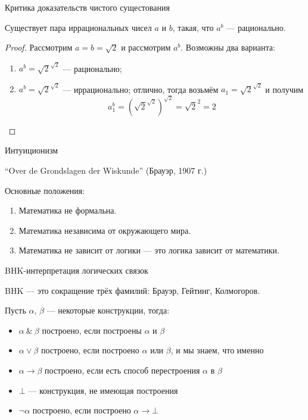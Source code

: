 \documentclass[aspectratio=169]{beamer}
\begin{document}
\begin{frame}{Критика доказательств чистого сущестования}
\begin{thmrus}Существует пара иррациональных чисел $a$ и $b$,
такая, что $a^b$ — рационально.
\end{thmrus}

\begin{proof}
Рассмотрим $a = b = \sqrt{2}$ и рассмотрим $a^b$.
Возможны два варианта:

\begin{enumerate}
\item $a^b = \sqrt{2}^{\sqrt{2}}$ — рационально;
\item $a^b = \sqrt{2}^{\sqrt{2}}$ — иррационально; отлично, 
тогда возьмём $a_1 = \sqrt{2}^{\sqrt{2}}$ и получим
$$a_1^b = \left({\sqrt{2}^{\sqrt{2}}}\right)^{\sqrt{2}} = \sqrt{2}^2 = 2$$
\end{enumerate}
\end{proof}

\end{frame}

\begin{frame}{Интуиционизм}

``Over de Grondslagen der Wiskunde'' (Брауэр, 1907 г.)

Основные положения:
\begin{enumerate}
\item Математика не формальна.
\item Математика независима от окружающего мира.
\item Математика не зависит от логики — это логика зависит от математики.
\end{enumerate}


%

\end{frame}

\begin{frame}{BHK-интерпретация логических связок}

BHK — это сокращение трёх фамилий: Брауэр, Гейтинг, Колмогоров. \pause

\vspace{1cm}

Пусть $\alpha$, $\beta$ --- некоторые конструкции, тогда:\pause

\begin{itemize}
\item $\alpha\ \&\ \beta$ построено, если построены $\alpha$ и $\beta$ \pause
\item $\alpha \vee \beta$ построено, если построено $\alpha$ или $\beta$,
и мы знаем, что именно \pause
\item $\alpha\rightarrow\beta$ построено, если есть способ перестроения
$\alpha$ в $\beta$\pause
\item $\bot$ — конструкция, не имеющая построения\pause
\item $\neg\alpha$ построено, если построено $\alpha\rightarrow\bot$
\end{itemize}
\end{frame}
\end{document}
